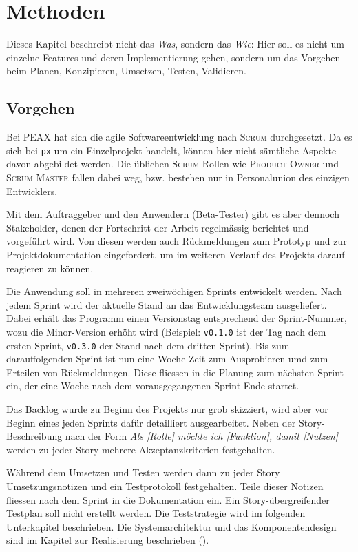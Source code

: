 \section{Methoden}

Dieses Kapitel beschreibt nicht das \textit{Was}, sondern das \textit{Wie}: Hier soll es nicht um einzelne Features und deren Implementierung gehen, sondern um das Vorgehen beim Planen, Konzipieren, Umsetzen, Testen, Validieren.

\subsection{Vorgehen}
\label{sec:Vorgehen}

Bei PEAX hat sich die agile Softwareentwicklung nach \textsc{Scrum} durchgesetzt. Da es sich bei \texttt{px} um ein Einzelprojekt handelt, können hier nicht sämtliche Aspekte davon abgebildet werden. Die üblichen \textsc{Scrum}-Rollen wie \textsc{Product Owner} und \textsc{Scrum Master} fallen dabei weg, bzw. bestehen nur in Personalunion des einzigen Entwicklers.

Mit dem Auftraggeber und den Anwendern (Beta-Tester) gibt es aber dennoch Stakeholder, denen der Fortschritt der Arbeit regelmässig berichtet und vorgeführt wird. Von diesen werden auch Rückmeldungen zum Prototyp und zur Projektdokumentation eingefordert, um im weiteren Verlauf des Projekts darauf reagieren zu können.

Die Anwendung soll in mehreren zweiwöchigen Sprints entwickelt werden. Nach jedem Sprint wird der aktuelle Stand an das Entwicklungsteam ausgeliefert. Dabei erhält das Programm einen Versionstag entsprechend der Sprint-Nummer, wozu die Minor-Version erhöht wird (Beispiel: \texttt{v0.1.0} ist der Tag nach dem ersten Sprint, \texttt{v0.3.0} der Stand nach dem dritten Sprint). Bis zum darauffolgenden Sprint ist nun eine Woche Zeit zum Ausprobieren umd zum Erteilen von Rückmeldungen. Diese fliessen in die Planung zum nächsten Sprint ein, der eine Woche nach dem vorausgegangenen Sprint-Ende startet.

Das Backlog wurde zu Beginn des Projekts nur grob skizziert, wird aber vor Beginn eines jeden Sprints dafür detailliert ausgearbeitet. Neben der Story-Beschreibung nach der Form \textit{Als [Rolle] möchte ich [Funktion], damit [Nutzen]} werden zu jeder Story mehrere Akzeptanzkriterien festgehalten.

Während dem Umsetzen und Testen werden dann zu jeder Story Umsetzungsnotizen und ein Testprotokoll festgehalten. Teile dieser Notizen fliessen nach dem Sprint in die Dokumentation ein. Ein Story-übergreifender Testplan soll nicht erstellt werden. Die Teststrategie wird im folgenden Unterkapitel beschrieben. Die Systemarchitektur und das Komponentendesign sind im Kapitel zur Realisierung beschrieben ().

